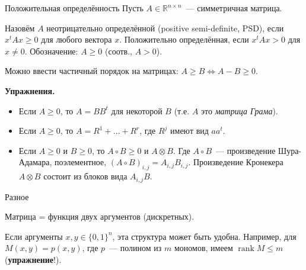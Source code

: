 \documentclass[12pt,handout]{beamer}
\renewcommand\le{\leqslant}
\renewcommand\ge{\geqslant}
\newcommand\R{\mathbb R}
\DeclareMathOperator{\rank}{rank}
\begin{document}
\begin{frame}{Положительная определённость}
    Пусть $A\in\R^{n\times n}$~--- симметричная матрица.
    
    Назовём $A$ неотрицательно определённой (positive semi-definite, PSD), если $x^tAx\ge 0$ для любого вектора $x$.
    Положительно определённая, если $x^tAx>0$ для $x\ne 0$. Обозначение: $A\ge
    0$ (соотв., $A>0$).

 Можно ввести частичный порядок на матрицах: $A\ge B\Leftrightarrow A-B\ge 0$.

    \textbf{Упражнения.}
    \begin{itemize}
        \item Если $A\ge 0$, то $A=BB^t$ для некоторой $B$ (т.е. $A$ это
            \textit{матрица Грама}).
        \item Если $A\ge 0$, то $A=R^1+\ldots+R^r$, где $R^j$ имеют
            вид $aa^t$.
        \item Если $A\ge 0$ и $B\ge 0$, то $A\circ B\ge 0$ и $A\otimes B$. Где $A\circ B$~---
            произведение Шура-Адамара, поэлементное, $(A\circ B)_{i,j} =
            A_{i,j}B_{i,j}$. Произведение Кронекера $A\otimes B$ состоит из
            блоков вида $A_{i,j}B$.
    \end{itemize}

\end{frame}

\begin{frame}{Разное}

    Матрица = функция двух аргументов (дискретных).

    Если аргументы $x,y\in\{0,1\}^n$, эта структура может быть удобна. Например,
    для $M(x,y)=p(x,y)$, где $p$~--- полином из $m$ мономов, имеем $\rank M\le
    m$ (\textbf{упражнение}!).

\end{frame}
\end{document}
